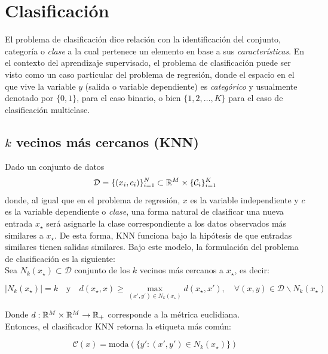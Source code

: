 
\section{Clasificación}
\label{cap:clasificacion}

El problema de clasificación dice relación con la identificación del conjunto, categoría o \emph{clase} a la cual pertenece un elemento en base a sus \emph{características}. En el contexto del aprendizaje supervisado, el problema de clasificación puede ser visto como un caso particular del problema de regresión, donde el espacio en el que vive la variable $y$ (salida o variable dependiente) es \emph{categórico} y usualmente denotado por $\{0,1\}$, para el caso binario, o bien $\{1,2,\ldots,K\}$ para el caso de clasificación multiclase. 
	
\subsection{$k$ vecinos más cercanos (KNN)}
Dado un conjunto de datos
\begin{equation}
	 	{\mathcal D} = \{(x_i,c_i)\}_{i=1}^N\subset\mathbb{R}^M\times\{{\mathcal C}_i\}_{i=1}^K
\end{equation}
donde, al igual que en el problema de regresión, $x$ es la variable independiente y $c$ es la variable dependiente o \emph{clase}, una forma natural de clasificar una nueva entrada $x_\star$ será asignarle la clase correspondiente a los datos observados más similares a $x_\star$. De esta forma, KNN funciona bajo la hipótesis de que entradas similares tienen salidas similares. Bajo este modelo, la formulación del problema de clasificación es la siguiente:\\

Sea $N_k(x_\star)\subset \mathcal{D}$ conjunto de los $k$ vecinos más cercanos a $x_\star$, es decir:

\begin{equation}
	|N_k(x_\star)|=k\quad\text{y}\quad d(x_\star,x)\geq \max_{(x',y')\in N_k(x_\star)} d(x_\star,x'),\quad\forall (x,y)\in \mathcal{D}\backslash N_k(x_\star)
\end{equation}

Donde $d:\mathbb{R}^M\times\mathbb{R}^M\to\mathbb{R}_+$ corresponde a la métrica euclidiana.\\

Entonces, el clasificador KNN retorna la etiqueta más común:

\begin{equation}
	\mathcal{C}(x) = \text{moda}\left(\{y':(x',y')\in N_k(x_\star)\}\right)
\end{equation}

